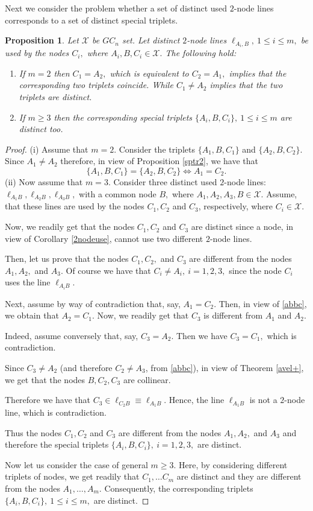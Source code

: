 \documentclass[a4paper,12pt]{article}
\newtheorem{proposition}[lemma]{Proposition}
\theoremstyle{definition}
\numberwithin{equation}{section}
\numberwithin{figure}{section}
\newcommand{\Xset}{\mathcal{X}}
\begin{document}
Next we consider the problem whether a set of distinct used $2$-node lines corresponds to a set of distinct special triplets.
\begin{proposition} \label{n>2}
Let $\Xset$ be $GC_n$ set.
Let distinct $2$-node lines $\ell_{A_i,B},\  1\le i\le m,$  be used by the nodes $C_i,$ where $A_i,B,C_i\in\Xset.$ The following hold:
\begin{enumerate}
\setlength{\itemsep}{0mm}
\item
If $m=2$ then $C_1=A_2,$ which is equivalent to $C_2=A_1,$ implies that the corresponding  two triplets coincide.
While $C_1\neq A_2$ implies that the two triplets are distinct.
\item
If $m\ge 3$ then the corresponding special triplets $\{A_i,B,C_i\},\  1\le i\le m$ are distinct too.
\end{enumerate}
\end{proposition}
\begin{proof}
(i) Assume that $m=2.$ Consider the triplets $\{A_1,B,C_1\}$ and $\{A_2,B,C_2\}.$
Since $A_1\neq A_2$ therefore, in view of Proposition \ref{sptr2}, we have that 
\begin{equation} \label{abbc}\{A_1,B,C_1\}=\{A_2,B,C_2\} \iff  A_1=C_2.\end{equation}
(ii) Now assume that $m=3.$ Consider three distinct used $2$-node lines: $\ell_{A_1B}, \ell_{A_2B}, \ell_{A_3B},$ with a common node $B,$ where $A_1,A_2,A_3,B\in \Xset.$
Assume, that these lines are
used by the nodes $C_1, C_2$ and  $C_3$, respectively, where $C_i\in \Xset.$

Now, we readily get that the nodes  $C_1,C_2$ and $C_3$ are distinct  since a node, in view of Corollary \ref{2nodeuse}, cannot use two different $2$-node lines. 

Then, let us prove that the nodes  $C_1,C_2,$ and $C_3$ are different from the nodes  $A_1,A_2,$ and $A_3.$ Of course we have that $C_i\neq A_i,\ i=1,2,3,$ since the node $C_i$ uses the line  $\ell_{A_iB}.$

Next, assume by way of contradiction that, say, $A_1=C_2.$ Then, in view of \eqref{abbc},  we obtain that $A_2=C_1.$ Now, we readily get that $C_3$ is different from $A_1$ and $A_2.$ 

Indeed, assume conversely that, say, $C_3=A_2.$ Then we have $C_3=C_1,$ which is contradiction.

Since $C_3\neq A_2$ (and therefore $C_2\neq A_3$, from \ref{abbc}),  in view of  Theorem \ref{avel+},  we get that the nodes $B, C_2, C_3$ are collinear.

Therefore we have that $C_3\in\ell_{C_2B}\equiv\ell_{A_1B}.$ Hence, the line $\ell_{A_1B}$ is not a $2$-node line, which is contradiction.


Thus the nodes  $C_1, C_2$ and $C_3$ are different from the nodes  $A_1,A_2,$ and $A_3$ and therefore the special triplets $\{A_i,B,C_i\},\  i=1,2,3,$ are distinct.

Now let us consider the case of general $m\ge 3.$ Here, by considering different triplets of nodes, we get readily that $C_1,\ldots C_m$ are distinct and
they are different from the nodes  $A_1,\ldots,A_m.$ Consequently, the corresponding triplets  $\{A_i,B,C_i\},\  1\le i\le m,$ are distinct.
\end{proof}
\end{document}
